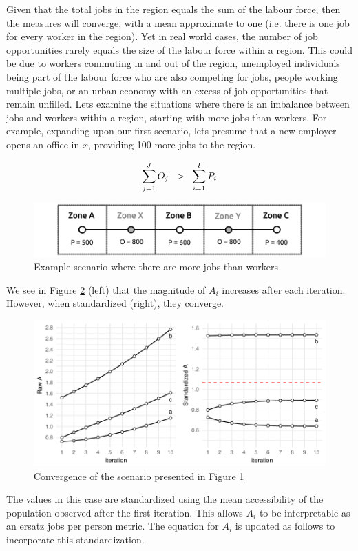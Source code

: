 \documentclass[11 pt, letterpaper]{article}
\begin{document}
{Given that the total jobs in the region equals the sum of the labour force, then the measures will converge, with a mean approximate to one (i.e. there is one job for every worker in the region). Yet in real world cases, the number of job opportunities rarely equals the size of the labour force within a region. This could be due to workers commuting in and out of the region, unemployed individuals being part of the labour force who are also competing for jobs, people working multiple jobs, or an urban economy with an excess of job opportunities that remain unfilled. Lets examine the situations where there is an imbalance between jobs and workers within a region, starting with more jobs than workers. For example, expanding upon our first scenario, lets presume that a new employer opens an office in $x$, providing 100 more jobs to the region.

\begin{equation}
\sum_{j = 1}^{J} O_j \hspace{2mm} > \hspace{2mm} \sum_{i = 1}^{I} P_i
\end{equation}
\begin{figure}[H]
	\caption{Example scenario where there are more jobs than workers}
	\label{S3}
	\centerline{\includegraphics[width=5in]{figures/linear_city/linear_city_S3.pdf}}
\end{figure}
We see in Figure \ref{S3c} (left) that the magnitude of $A_i$ increases after each iteration. However, when standardized (right), they converge. 
\begin{figure}[H]
	\caption{Convergence of the scenario presented in Figure \ref{S3}}
	\label{S3c}
	\centerline{\includegraphics[width=6in]{figures/convg/conRS3.pdf}}
	\vspace{2mm}
\end{figure}
The values in this case are standardized using the mean accessibility of the population observed after the first iteration. This allows $A_i$ to be interpretable as an ersatz jobs per person metric. The equation for $A_i$ is updated as follows to incorporate this standardization.

}
\end{document}
